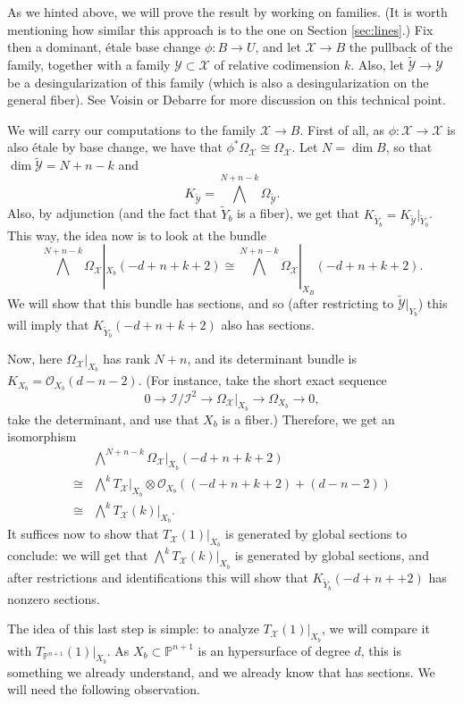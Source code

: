 \documentclass[leqno, openany]{memoir}
\theoremstyle{definition}
\theoremstyle{remark}
\theoremstyle{plain}
\theoremstyle{definition}
\theoremstyle{remark}
\renewcommand{\P}{\mathbb{P}}
\newcommand{\mc}[1]{\mathcal{#1}}
\begin{document}
As we hinted above, we will prove the result by working on families. (It is worth mentioning how similar this approach is to the one on Section \ref{sec:lines}.) Fix then a dominant, étale base change $\phi\colon B \to U$, and let $\mc{X} \to B$ the pullback of the family, together with a family $\mc{Y} \subset \mc{X}$ of relative codimension $k$. Also, let $\tilde{\mc{Y}} \to \mc{Y}$ be a desingularization of this family (which is also a desingularization on the general fiber). See Voisin or Debarre for more discussion on this technical point. 

We will carry our computations to the family $\mc{X} \to B$. First of all, as $\phi\colon \mc{X} \to \mc{X}$ is also étale by base change, we have that $\phi^\ast \Omega_\mc{X} \cong \Omega_{\mc{X}}$. Let $N=\dim B$, so that $\dim \tilde{\mc{Y}}=N+n-k$ and
\[ K_{\tilde{\mc{Y}}} = \bigwedge^{N+n-k} \Omega_{\tilde{\mc{Y}}}. \]
Also, by adjunction (and the fact that $\tilde{Y}_b$ is a fiber), we get that $K_{\tilde{Y}_b}=K_{\tilde{\mc{Y}}}|_{\tilde{Y}_b}$. This way, the idea now is to look at the bundle
\[ \bigwedge^{N+n-k} \Omega_{\mc{X}}|_{X_b}(-d+n+k+2) \cong \bigwedge^{N+n-k} \Omega_{\mc{X}}|_{X_B}(-d+n+k+2). \]
We will show that this bundle has sections, and so (after restricting to $\tilde{\mc{Y}}|_{Y_b}$) this will imply that $K_{\tilde{Y}_b}(-d+n+k+2)$ also has sections. 

Now, here $\Omega_{\mc{X}}|_{X_b}$ has rank $N+n$, and its determinant bundle is $K_{X_b} = \mc{O}_{X_b}(d-n-2)$. (For instance, take the short exact sequence
\[ 0 \to \mc{I}/\mc{I}^2 \to \Omega_{\mc{X}}|_{X_b} \to \Omega_{X_b} \to 0, \]
take the determinant, and use that $X_b$ is a fiber.) Therefore, we get an isomorphism 
\begin{align*}
    &\bigwedge^{N+n-k} \Omega_{\mc{X}}|_{X_b}(-d+n+k+2) \\
    \cong& \bigwedge^k T_{\mc{X}}|_{X_b} \otimes \mc{O}_{X_b}((-d+n+k+2)+(d-n-2)) \\
    \cong& \bigwedge^k T_{\mc{X}}(k)|_{X_b}.
\end{align*}
It suffices now to show that $T_{\mc{X}}(1)|_{X_b}$ is generated by global sections to conclude: we will get that $\bigwedge^k T_{ \mc{X} }(k)|_{X_b}$ is generated by global sections, and after restrictions and identifications this will show that $K_{\tilde{Y}_b}(-d+n++2)$ has nonzero sections.

The idea of this last step is simple: to analyze $T_{\mc{X}}(1)|_{X_b}$, we will compare it with $T_{\P^{n+1}}(1)|_{X_b}$. As $X_b \subset \P^{n+1}$ is an hypersurface of degree $d$, this is something we already understand, and we already know that has sections. We will need the following observation.
\end{document}
